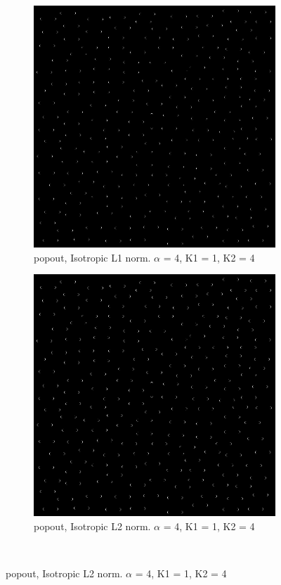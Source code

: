 \begin{figure}[H]
\centering

  \begin{subfigure}{.7\textwidth}
    \centering
    \includegraphics[width=.9\textwidth]{./canny/popout_L1_a4_k11_k24}
    \caption{popout, Isotropic L1 norm. $\alpha$ = 4, K1 = 1, K2 = 4}
    \label{fig:popout_L1_a4_k11_k24}
  \end{subfigure}%
  
  \begin{subfigure}{.7\textwidth}
    \centering
    \includegraphics[width=.9\textwidth]{./canny/popout_L2_a4_k11_k24}
    \caption{popout, Isotropic L2 norm. $\alpha$ = 4, K1 = 1, K2 = 4}
    \label{fig:popout_L2_a4_k11_k24}
  \end{subfigure}\\%
 \end{figure}

